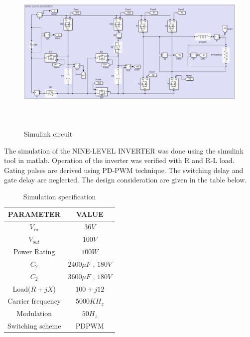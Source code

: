 \documentclass[12pt,a4paper]{report}
\begin{document}
\begin{figure}[h!]
\begin{center}
	\includegraphics[width=16cm,height=8cm]{figures/SIMULINKCIRCUIT.png}
\end{center}
\caption{Simulink circuit}
\label{simlnk}
\end{figure}
The simulation of the NINE-LEVEL INVERTER was done using the simulink tool in matlab.
Operation of the inverter was verified with R and R-L load. Gating pulses are derived using PD-PWM technique. The switching delay and gate delay are neglected. The design consideration are given in the table below. \\

\begin{table}[H]
	\begin{center}
		\begin{tabular}{|c|c|} 
			\hline
			{\bf PARAMETER} & {\bf VALUE} \\  
			\hline
			$V_{in}$ & $36V$ \\ 
			\hline
			$V_{out}$ & $100V$ \\ 
			\hline
			Power Rating & $100W$ \\ 
			\hline
			$C_2$  & $2400{\mu}F$ , $180V$ \\
			\hline
			$C_2$  & $3600{\mu}F$ , $180V$ \\
			\hline
			Load($R+jX$) & $100 + j12$\\
			\hline
			Carrier frequency & $5000KH_z$  \\
			\hline
			Modulation & $50H_z$ \\
			\hline
			Switching scheme & PDPWM \\
			\hline
\end{tabular}
	\end{center}
	\caption{Simulation specification}
\end{table}
\end{document}
